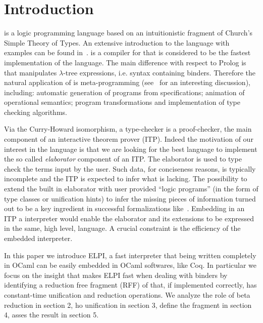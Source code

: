 \documentclass{llncs}
\begin{document}
\section{Introduction}%
\lp{} is a logic programming language based on an intuitionistic fragment of
Church's Simple Theory of Types. An extensive introduction to the language
with examples can be found in~\cite{Miller:2012:PHL:2331097}. \tedius{}
\cite{DBLP:conf/cade/NadathurM99,DBLP:journals/corr/abs-0911-5203} is a
compiler for \lp{} %
that is considered to be the fastest
implementation of the language. 
The main difference with respect to Prolog is that \lp{} manipulates
$\lambda$-tree expressions, i.e. syntax containing binders. Therefore the
natural application of \lp{} is meta-programming (see~\cite{LPAZ} for
an interesting discussion), including: automatic generation of programs from
specifications; animation of operational semantics;
program transformations and implementation of type checking algorithms.

Via the Curry-Howard isomorphism, a type-checker is a proof-checker, the main
component of an interactive theorem prover (ITP). Indeed the motivation of our
interest in the language is that we are looking for the best 
language to implement the so called \emph{elaborator} component of an ITP.
The elaborator is used to type check the terms input by
the user.  Such data, for conciseness reasons, is typically incomplete and
the ITP is expected to infer what is lacking.  The possibility to
extend the built in elaborator with user provided ``logic programs'' (in the
form of type classes or unification hints) to infer the missing pieces of
information turned out to be a key ingredient in successful formalizations
like~\cite{gonthier:hal-00816699}.  Embedding in an ITP a \lp{} interpreter
would enable the elaborator and its extensions to be expressed in the same,
high level, language.  A crucial constraint is the efficiency of the embedded
\lp{} interpreter.

In this paper we introduce ELPI, a fast \lp{} interpreter that being written
completely in OCaml can be easily embedded in OCaml softwares, like Coq.
In particular we focus on the insight that makes ELPI fast when dealing with
binders by identifying a reduction free fragment (RFF) of \lp{} that, if
implemented correctly, has constant-time unification and reduction operations.
We analyze the role  of beta reduction in section 2, ho unification in section 3, define the fragment in section 4, asses the result in section 5.
\end{document}
